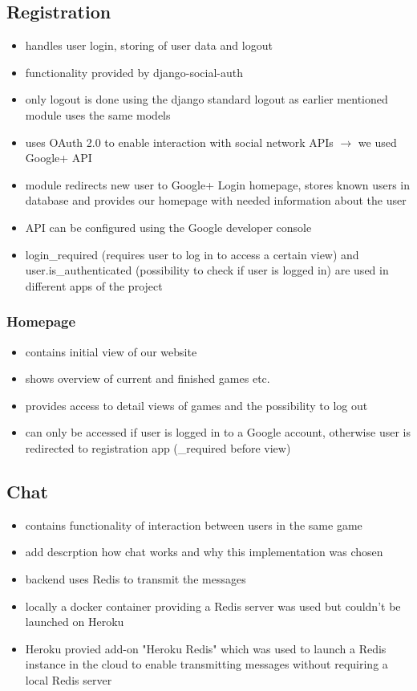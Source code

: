 \documentclass{article}
\begin{document}
\subsection{Registration}
\begin{itemize}
\item handles user login, storing of user data and logout
\item functionality provided by django-social-auth
\item only logout is done using the django standard logout as earlier mentioned module uses the same models
\item uses OAuth 2.0 to enable interaction with social network APIs $\to$ we used Google+ API
\item module redirects new user to Google+ Login homepage, stores known users in database and provides our homepage with needed information about the user
\item API can be configured using the Google developer console 
\item login\_required (requires user to log in to access a certain view) and user.is\_authenticated (possibility to check if user is logged in) are used in different apps of the project
\end{itemize}
\subsubsection{Homepage}
\begin{itemize}
\item contains initial view of our website
\item shows overview of current and finished games etc.
\item provides access to detail views of games and the possibility to log out
\item can only be accessed if user is logged in to a Google account, otherwise user is redirected to registration app (\@login\_required before view)
\end{itemize}
\subsection{Chat}
\begin{itemize}
\item contains functionality of interaction between users in the same game
\item add descrption how chat works and why this implementation was chosen
\item backend uses Redis to transmit the messages
\item locally a docker container providing a Redis server was used but couldn't be launched on Heroku
\item Heroku provied add-on "Heroku Redis" which was used to launch a Redis instance in the cloud to enable transmitting messages without requiring a local Redis server
\end{itemize}
\end{document}
